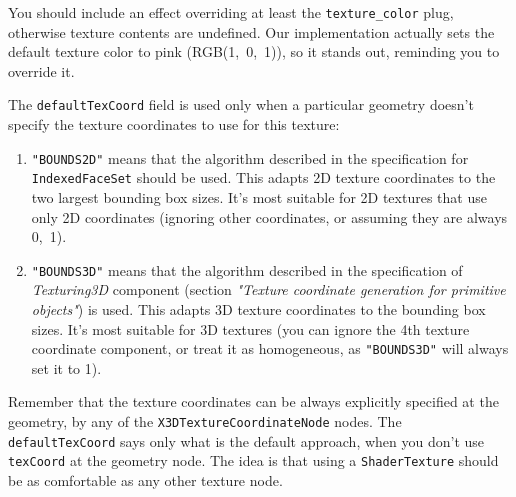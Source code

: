 \documentclass{acmsiggraph}                     %
\begin{document}
You should include an effect overriding at least the \texttt{texture\_color}
plug, otherwise texture contents are undefined. Our implementation actually
sets the default texture color to pink (RGB(1,~0,~1)), so it stands out,
reminding you to override it.

The \texttt{defaultTexCoord} field is used only when a particular geometry
doesn't specify the texture coordinates to use for this texture:

\begin{enumerate}

\item
  \texttt{"BOUNDS2D"} means that the algorithm described in the specification
  for \texttt{IndexedFaceSet} should be used. This adapts 2D texture coordinates
  to the two largest bounding box sizes.
  It's most suitable for 2D textures that use only 2D coordinates
  (ignoring other coordinates, or assuming they are always 0,~1).

\item
  \texttt{"BOUNDS3D"} means that the algorithm described in the specification
  of \textit{Texturing3D} component (section \textit{"Texture coordinate generation for primitive objects"})
  is used.
  This adapts 3D texture coordinates to the bounding box sizes.
  It's most suitable for 3D textures (you can ignore the 4th texture coordinate
  component, or treat it as homogeneous, as \texttt{"BOUNDS3D"} will always
  set it to 1).

\end{enumerate}

Remember that the texture coordinates can be always explicitly specified
at the geometry, by any of the \texttt{X3DTextureCoordinateNode} nodes.
The \texttt{defaultTexCoord} says only what is the default approach,
when you don't use \texttt{texCoord} at the geometry node.
The idea is that using a \texttt{ShaderTexture} should be as comfortable
as any other texture node.

\end{document}
